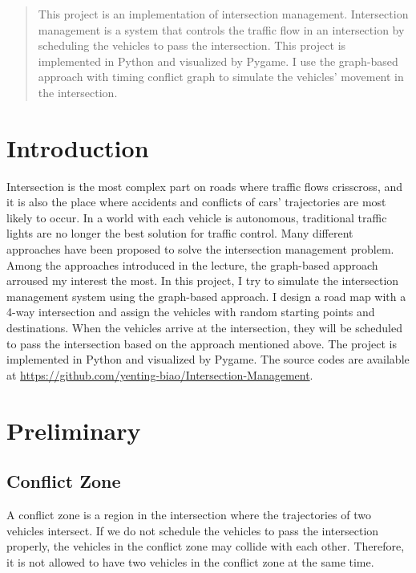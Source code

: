 \documentclass{article}
\begin{document}
\setlength{\columnsep}{0.8cm}
\begin{multicols*}{1}

\begin{abstract}
    This project is an implementation of intersection management. Intersection management is a system that controls the traffic flow in an intersection by scheduling the vehicles to pass the intersection. This project is implemented in Python and visualized by Pygame. I use the graph-based approach with timing conflict graph to simulate the vehicles' movement in the intersection.
    
\end{abstract}
    \section{Introduction} 
    Intersection is the most complex part on roads where traffic flows crisscross, and it is also the place where accidents and conflicts of cars' trajectories are most likely to occur. In a world with each vehicle is autonomous, traditional traffic lights are no longer the best solution for traffic control. Many different approaches have been proposed to solve the intersection management problem. Among the approaches introduced in the lecture, the graph-based approach arroused my interest the most. In this project, I try to simulate the intersection management system using the graph-based approach. I design a road map with a 4-way intersection and assign the vehicles with random starting points and destinations. When the vehicles arrive at the intersection, they will be scheduled to pass the intersection based on the approach mentioned above. The project is implemented in Python and visualized by Pygame. The source codes are available at \url{https://github.com/yenting-biao/Intersection-Management}.

    \section{Preliminary}
    \subsection{Conflict Zone}
    A conflict zone is a region in the intersection where the trajectories of two vehicles intersect. If we do not schedule the vehicles to pass the intersection properly, the vehicles in the conflict zone may collide with each other. Therefore, it is not allowed to have two vehicles in the conflict zone at the same time.

\end{multicols*}
\end{document}
